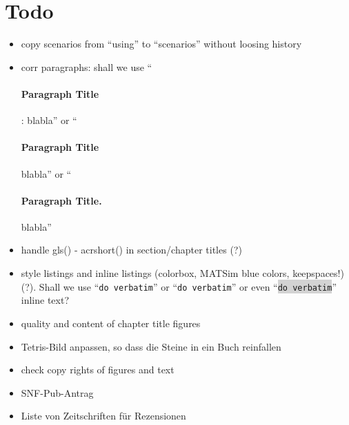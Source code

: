 \section*{Todo}

\begin{itemize}\styleItemize

\item copy scenarios from ``using'' to ``scenarios'' without loosing history

\item corr paragraphs: shall we use ``\paragraph{Paragraph Title}: blabla'' or ``\paragraph{Paragraph Title} blabla'' or ``\paragraph{Paragraph Title.} blabla''

\item handle gls() - acrshort() in section/chapter titles (?)

\item style listings and inline listings (colorbox, MATSim blue colors, keepspaces!) (?). Shall we use ``\verb|do verbatim|'' or ``\lstinline|do verbatim|'' or even ``\colorbox{lightgray}{\lstinline|do verbatim|}'' inline text?

\item quality and content of chapter title figures

\item Tetris-Bild anpassen, so dass die Steine in ein Buch reinfallen

\item check copy rights of figures and text

\item SNF-Pub-Antrag

\item Liste von Zeitschriften für Rezensionen





\end{itemize}
